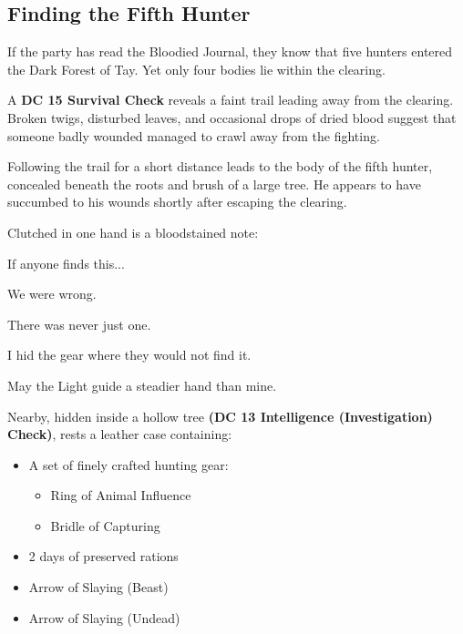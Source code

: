\subsection*{Finding the Fifth Hunter}
{\entryfont If the party has read the Bloodied Journal, they know that five hunters entered the Dark Forest of Tay. Yet only four bodies lie within the clearing.

A \textbf{DC 15 Survival Check} reveals a faint trail leading away from the clearing. Broken twigs, disturbed leaves, and occasional drops of dried blood suggest that someone badly wounded managed to crawl away from the fighting.

Following the trail for a short distance leads to the body of the fifth hunter, concealed beneath the roots and brush of a large tree. He appears to have succumbed to his wounds shortly after escaping the clearing.

Clutched in one hand is a bloodstained note:}
\begin{BloodiedNote}[font=\handwrittenfont, fontsize=18pt]
	If anyone finds this...

	We were wrong.

	There was never just one.

	I hid the gear where they would not find it.

	May the Light guide a steadier hand than mine.
\end{BloodiedNote}
{\noindent\entryfont Nearby, hidden inside a hollow tree \textbf{(DC 13 Intelligence (Investigation) Check)}, rests a leather case containing:
\begin{itemize}
	\item A set of finely crafted hunting gear:
	\begin{itemize}
		\item Ring of Animal Influence
		\item Bridle of Capturing
	\end{itemize}
	\item 2 days of preserved rations
	\item Arrow of Slaying (Beast)
	\item Arrow of Slaying (Undead)
\end{itemize}}